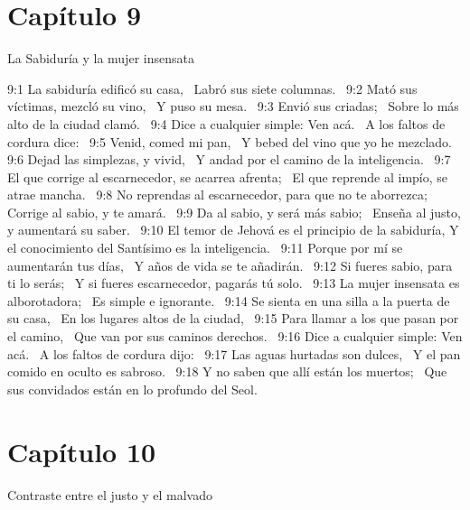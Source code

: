 \section*{Capítulo 9 }
La Sabiduría y la mujer insensata  

9:1 La sabiduría edificó su casa,  
Labró sus siete columnas.  
9:2 Mató sus víctimas, mezcló su vino,  
Y puso su mesa.  
9:3 Envió sus criadas;  
Sobre lo más alto de la ciudad clamó.  
9:4 Dice a cualquier simple: Ven acá.  
A los faltos de cordura dice:  
9:5 Venid, comed mi pan,  
Y bebed del vino que yo he mezclado.  
9:6 Dejad las simplezas, y vivid,  
Y andad por el camino de la inteligencia.  
9:7 El que corrige al escarnecedor, se acarrea afrenta;  
El que reprende al impío, se atrae mancha.  
9:8 No reprendas al escarnecedor, para que no te aborrezca;  
Corrige al sabio, y te amará.  
9:9 Da al sabio, y será más sabio;  
Enseña al justo, y aumentará su saber.  
9:10 El temor de Jehová es el principio de la sabiduría, 
Y el conocimiento del Santísimo es la inteligencia.  
9:11 Porque por mí se aumentarán tus días,  
Y años de vida se te añadirán.  
9:12 Si fueres sabio, para ti lo serás;  
Y si fueres escarnecedor, pagarás tú solo.  
9:13 La mujer insensata es alborotadora;  
Es simple e ignorante.  
9:14 Se sienta en una silla a la puerta de su casa,  
En los lugares altos de la ciudad,  
9:15 Para llamar a los que pasan por el camino,  
Que van por sus caminos derechos.  
9:16 Dice a cualquier simple: Ven acá.  
A los faltos de cordura dijo:  
9:17 Las aguas hurtadas son dulces,  
Y el pan comido en oculto es sabroso.  
9:18 Y no saben que allí están los muertos;  
Que sus convidados están en lo profundo del Seol.  
\section*{Capítulo 10 }
Contraste entre el justo y el malvado  

